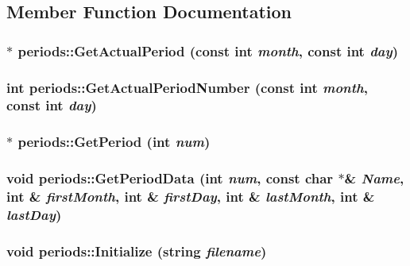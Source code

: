 \subsection{Member Function Documentation}
\hypertarget{classperiods_a7d603035820b13950719ffff6af8f9c2}{
\subsubsection[{GetActualPeriod}]{ $\ast$ periods::GetActualPeriod (const int {\em month}, \/  const int {\em day})}}
\label{classperiods_a7d603035820b13950719ffff6af8f9c2}
\hypertarget{classperiods_a44361b4f807693968fcc1c5b70c015d6}{
\subsubsection[{GetActualPeriodNumber}]{\setlength{\rightskip}{0pt plus 5cm}int periods::GetActualPeriodNumber (const int {\em month}, \/  const int {\em day})}}
\label{classperiods_a44361b4f807693968fcc1c5b70c015d6}
\hypertarget{classperiods_a0e9206e33b8b0caa791477048170fd1d}{
\subsubsection[{GetPeriod}]{ $\ast$ periods::GetPeriod (int {\em num})}}
\label{classperiods_a0e9206e33b8b0caa791477048170fd1d}
\hypertarget{classperiods_a5e4c803ff5ed191628246ca1bed7ef13}{
\subsubsection[{GetPeriodData}]{\setlength{\rightskip}{0pt plus 5cm}void periods::GetPeriodData (int {\em num}, \/  const char $\ast$\& {\em Name}, \/  int \& {\em firstMonth}, \/  int \& {\em firstDay}, \/  int \& {\em lastMonth}, \/  int \& {\em lastDay})}}
\label{classperiods_a5e4c803ff5ed191628246ca1bed7ef13}
\hypertarget{classperiods_ae425558a335cbc501737abe59f2869b2}{
\subsubsection[{Initialize}]{\setlength{\rightskip}{0pt plus 5cm}void periods::Initialize (string {\em filename})}}
